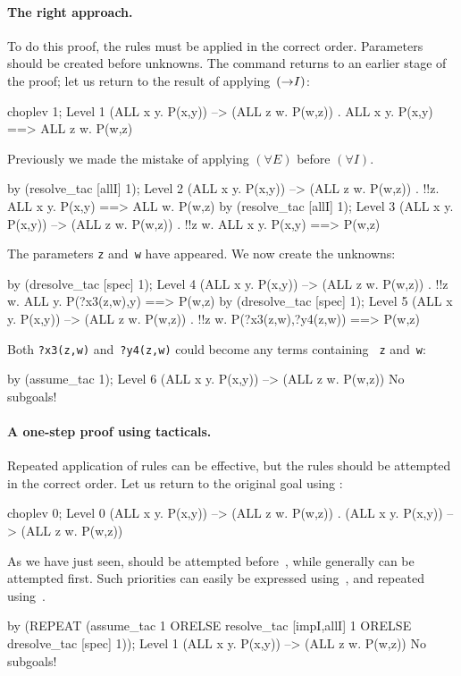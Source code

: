 \paragraph{The right approach.}
To do this proof, the rules must be applied in the correct order.
Parameters should be created before unknowns.  The
 command returns to an earlier stage of the proof;
let us return to the result of applying~$({\rightarrow}I)$:
\begin{ttbox}
choplev 1;
{\out Level 1}
{\out (ALL x y. P(x,y)) --> (ALL z w. P(w,z))}
{. ALL x y. P(x,y) ==> ALL z w. P(w,z)}
\end{ttbox}
Previously we made the mistake of applying $(\forall E)$ before $(\forall I)$.
\begin{ttbox}
by (resolve_tac [allI] 1);
{\out Level 2}
{\out (ALL x y. P(x,y)) --> (ALL z w. P(w,z))}
{. !!z. ALL x y. P(x,y) ==> ALL w. P(w,z)}
\ttbreak
by (resolve_tac [allI] 1);
{\out Level 3}
{\out (ALL x y. P(x,y)) --> (ALL z w. P(w,z))}
{. !!z w. ALL x y. P(x,y) ==> P(w,z)}
\end{ttbox}
The parameters \texttt{z} and~\texttt{w} have appeared.  We now create the
unknowns:
\begin{ttbox}
by (dresolve_tac [spec] 1);
{\out Level 4}
{\out (ALL x y. P(x,y)) --> (ALL z w. P(w,z))}
{. !!z w. ALL y. P(?x3(z,w),y) ==> P(w,z)}
\ttbreak
by (dresolve_tac [spec] 1);
{\out Level 5}
{\out (ALL x y. P(x,y)) --> (ALL z w. P(w,z))}
{. !!z w. P(?x3(z,w),?y4(z,w)) ==> P(w,z)}
\end{ttbox}
Both {\tt?x3(z,w)} and~{\tt?y4(z,w)} could become any terms containing {\tt
z} and~\texttt{w}:
\begin{ttbox}
by (assume_tac 1);
{\out Level 6}
{\out (ALL x y. P(x,y)) --> (ALL z w. P(w,z))}
{\out No subgoals!}
\end{ttbox}

\paragraph{A one-step proof using tacticals.}
  

Repeated application of rules can be effective, but the rules should be
attempted in the correct order.  Let us return to the original goal using
:
\begin{ttbox}
choplev 0;
{\out Level 0}
{\out (ALL x y. P(x,y)) --> (ALL z w. P(w,z))}
{. (ALL x y. P(x,y)) --> (ALL z w. P(w,z))}
\end{ttbox}
As we have just seen,  should be attempted
before~, while  generally can be
attempted first.  Such priorities can easily be expressed
using~, and repeated using~.
\begin{ttbox}
by (REPEAT (assume_tac 1 ORELSE resolve_tac [impI,allI] 1
     ORELSE dresolve_tac [spec] 1));
{\out Level 1}
{\out (ALL x y. P(x,y)) --> (ALL z w. P(w,z))}
{\out No subgoals!}
\end{ttbox}



